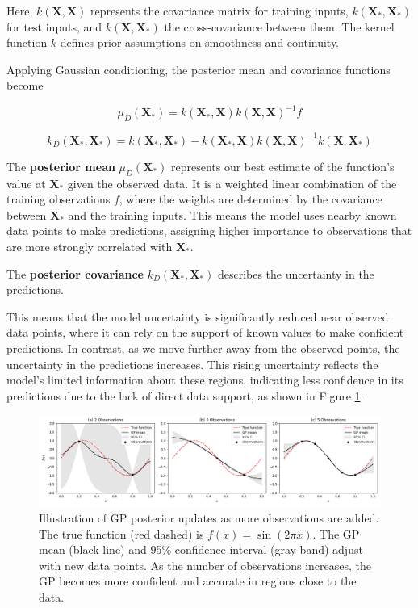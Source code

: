 \documentclass{ut-thesis}
\begin{document}
Here, $ k(\mathbf{X},\mathbf{X}) $ represents the covariance matrix for training inputs, $ k(\mathbf{X_*},\mathbf{X_*} ) $ for test inputs, and $ k(\mathbf{X},\mathbf{X_*}) $ the cross-covariance between them. The kernel function $ k $ defines prior assumptions on smoothness and continuity.

Applying Gaussian conditioning, the posterior mean and covariance functions become

\begin{equation}
    \mu_D(\mathbf{X_*}) = k(\mathbf{X_*}, \mathbf{X}) k(\mathbf{X}, \mathbf{X})^{-1} f
\end{equation}

\begin{equation}
    k_D(\mathbf{X_*}, \mathbf{X_*}) = k(\mathbf{X_*}, \mathbf{X_*}) - k(\mathbf{X_*}, \mathbf{X}) k(\mathbf{X}, \mathbf{X})^{-1} k(\mathbf{X}, \mathbf{X_*})
\end{equation}

The \textbf{posterior mean} \( \mu_D(\mathbf{X_*}) \) represents our best estimate of the function's value at \( \mathbf{X_*} \) given the observed data. It is a weighted linear combination of the training observations \( f \), where the weights are determined by the covariance between \( \mathbf{X_*} \) and the training inputs. This means the model uses nearby known data points to make predictions, assigning higher importance to observations that are more strongly correlated with \( \mathbf{X_*} \).

The \textbf{posterior covariance} \( k_D(\mathbf{X_*}, \mathbf{X_*}) \) describes the uncertainty in the predictions. 

This means that the model uncertainty is significantly reduced near observed data points, where it can rely on the support of known values to make confident predictions. In contrast, as we move further away from the observed points, the uncertainty in the predictions increases. This rising uncertainty reflects the model’s limited information about these regions, indicating less confidence in its predictions due to the lack of direct data support, as shown in Figure \ref{fig:gp_updates}.

\begin{figure}[htbp]
    \centering
    \includegraphics[width=\textwidth]{gp_post.png}
    \caption[Gaussian Process updates with added observations]{
        Illustration of GP posterior updates as more observations are added. 
        The true function (red dashed) is \( f(x) = \sin(2\pi x) \). 
        The GP mean (black line) and 95\% confidence interval (gray band) adjust with new data points.
        As the number of observations increases, the GP becomes more confident and accurate in regions close to the data.
    }
    \label{fig:gp_updates}
\end{figure}
\end{document}

